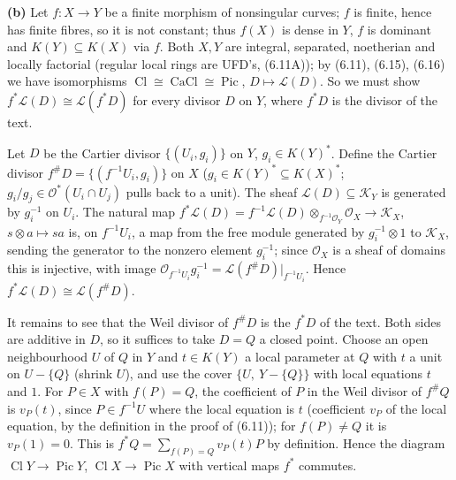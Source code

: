 \documentclass[11pt]{article}
\begin{document}
\textbf{(b)} Let $f:X\to Y$ be a finite morphism of nonsingular curves; $f$ is finite, hence has finite fibres, so it is not constant; thus $f(X)$ is dense in $Y$, $f$ is dominant and $K(Y)\subseteq K(X)$ via $f$. Both $X,Y$ are integral, separated, noetherian and locally factorial (regular local rings are UFD's, (6.11A)); by (6.11), (6.15), (6.16) we have isomorphisms $\operatorname{Cl}\cong\operatorname{CaCl}\cong\operatorname{Pic}$, $D\mapsto\mathcal L(D)$. So we must show $f^*\mathcal L(D)\cong\mathcal L(f^*D)$ for every divisor $D$ on $Y$, where $f^*D$ is the divisor of the text.

Let $D$ be the Cartier divisor $\{(U_i,g_i)\}$ on $Y$, $g_i\in K(Y)^*$. Define the Cartier divisor $f^\#D=\{(f^{-1}U_i,g_i)\}$ on $X$ ($g_i\in K(Y)^*\subseteq K(X)^*$; $g_i/g_j\in\mathcal O^*(U_i\cap U_j)$ pulls back to a unit). The sheaf $\mathcal L(D)\subseteq\mathcal K_Y$ is generated by $g_i^{-1}$ on $U_i$. The natural map $f^*\mathcal L(D)=f^{-1}\mathcal L(D)\otimes_{f^{-1}\mathcal O_Y}\mathcal O_X\to\mathcal K_X$, $s\otimes a\mapsto sa$ is, on $f^{-1}U_i$, a map from the free module generated by $g_i^{-1}\otimes1$ to $\mathcal K_X$, sending the generator to the nonzero element $g_i^{-1}$; since $\mathcal O_X$ is a sheaf of domains this is injective, with image $\mathcal O_{f^{-1}U_i}g_i^{-1}=\mathcal L(f^\#D)|_{f^{-1}U_i}$. Hence $f^*\mathcal L(D)\cong\mathcal L(f^\#D)$.

It remains to see that the Weil divisor of $f^\#D$ is the $f^*D$ of the text. Both sides are additive in $D$, so it suffices to take $D=Q$ a closed point. Choose an open neighbourhood $U$ of $Q$ in $Y$ and $t\in K(Y)$ a local parameter at $Q$ with $t$ a unit on $U-\{Q\}$ (shrink $U$), and use the cover $\{U,\ Y-\{Q\}\}$ with local equations $t$ and $1$. For $P\in X$ with $f(P)=Q$, the coefficient of $P$ in the Weil divisor of $f^\#Q$ is $v_P(t)$, since $P\in f^{-1}U$ where the local equation is $t$ (coefficient $v_P$ of the local equation, by the definition in the proof of (6.11)); for $f(P)\ne Q$ it is $v_P(1)=0$. This is $f^*Q=\sum_{f(P)=Q}v_P(t)P$ by definition. Hence the diagram $\operatorname{Cl}Y\to\operatorname{Pic}Y$, $\operatorname{Cl}X\to\operatorname{Pic}X$ with vertical maps $f^*$ commutes.
\end{document}
